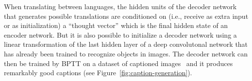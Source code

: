 \documentclass[]{article}
\begin{document}
\begin{figure}[H]
\label{fig:word-embeddings}
\end{figure}

When translating between languages, the hidden units of the decoder network
that generates possible translations are conditioned on (i.e., receive as extra
input or as initialization) a ``thought
vector'' which is the final hidden state of an encoder network.  But it is
also possible to initialize a decoder network using a linear transformation
of the last hidden layer of a deep convolutonal network that has already
been trained to recognize objects in images. The decoder network can then
be trained by BPTT on a dataset of captioned
images~\citep{NIC,StanfordNIC,more?} and it produces remarkably good
captions (see Figure~\ref{fig:caption-generation}).
\end{document}
